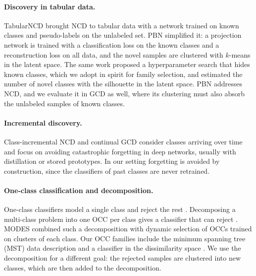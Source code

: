 \documentclass[pdflatex,sn-basic]{sn-jnl}
\begin{document}
\paragraph{Discovery in tabular data.}
TabularNCD \citep{troisemaine2022tabularncd} brought NCD to tabular data with a network trained on known classes and pseudo-labels on the unlabeled set. PBN \citep{troisemaine2024pbn} simplified it: a projection network is trained with a classification loss on the known classes and a reconstruction loss on all data, and the novel samples are clustered with $k$-means in the latent space. The same work proposed a hyperparameter search that hides known classes, which we adopt in spirit for family selection, and estimated the number of novel classes with the silhouette in the latent space. PBN addresses NCD, and we evaluate it in GCD as well, where its clustering must also absorb the unlabeled samples of known classes.

\paragraph{Incremental discovery.}
Class-incremental NCD \citep{roy2022incd,joseph2022ncdwf} and continual GCD \citep{wu2023metagcd} consider classes arriving over time and focus on avoiding catastrophic forgetting in deep networks, usually with distillation or stored prototypes. In our setting forgetting is avoided by construction, since the classifiers of past classes are never retrained.

\paragraph{One-class classification and decomposition.}
One-class classifiers model a single class and reject the rest \citep{tax2004svdd,scholkopf2001ocsvm,khan2014occ,pimentel2014novelty}. Decomposing a multi-class problem into one OCC per class gives a classifier that can reject \citep{krawczyk2016dcs}. MODES \citep{fragoso2021modes} combined such a decomposition with dynamic selection of OCCs trained on clusters of each class. Our OCC families include the minimum spanning tree (MST) data description \citep{juszczak2009mstdd} and a classifier in the dissimilarity space \citep{cha2000dichotomy,teixeira2025osr}. We use the decomposition for a different goal: the rejected samples are clustered into new classes, which are then added to the decomposition.
\end{document}
